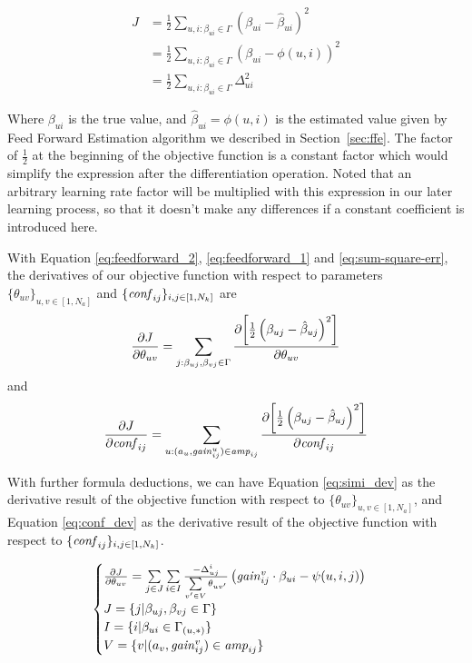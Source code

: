 \begin{equation}
  \label{eq:sum-square-err}
  \begin{aligned}
    J &= \frac{1}{2} \sum_{u,i:\beta_{ui}\in\Gamma} \left(\beta_{ui}-\hat{\beta}_{ui}\right)^2 \\
    &= \frac{1}{2} \sum_{u,i:\beta_{ui}\in\Gamma} \left(\beta_{ui}-\phi(u,i)\right)^2 \\
    &= \frac{1}{2} \sum_{u,i:\beta_{ui}\in\Gamma} \Delta^2_{ui}
  \end{aligned}
\end{equation}

Where $\beta_{ui}$ is the true value, and $\hat{\beta}_{ui}=\phi(u,i)$
is the estimated value given by Feed Forward Estimation algorithm we
described in Section~\ref{sec:ffe}. The factor of $\frac{1}{2}$ at the
beginning of the objective function is a constant factor which would
simplify the expression after the differentiation operation. Noted
that an arbitrary learning rate factor will be multiplied with this
expression in our later learning process, so that it doesn't make any
differences if a constant coefficient is introduced here.

With Equation \ref{eq:feedforward_2}, \ref{eq:feedforward_1} and
\ref{eq:sum-square-err}, the derivatives of our objective function
with respect to parameters $\{\theta_{uv}\}_{u,v\in[1,N_a]}$ and
$\{\mathit{conf}_{ij}\}_{i,j\in[1,N_k]}$ are
\[
\frac{\partial {J}}{\partial {\theta_{uv}}} = \sum_{j:\beta_{uj},\beta_{vj}\in\Gamma} \frac{\partial {\left[\frac{1}{2}\left(\beta_{uj}-\hat{\beta}_{uj}\right)^2\right]}}{\partial {\theta_{uv}}}
\]
and
\[
\frac{\partial {J}}{\partial {\mathit{conf}_{ij}}} = \sum_{u:(a_u,\mathit{gain}^{u}_{ij})\in\mathit{amp}_{ij}} \frac{\partial {\left[\frac{1}{2}\left(\beta_{uj}-\hat{\beta}_{uj}\right)^2\right]}}{\partial {\mathit{conf}_{ij}}}
\]

With further formula deductions, we can have Equation
\ref{eq:simi_dev} as the derivative result of the objective function
with respect to $\{\theta_{uv}\}_{u,v\in[1,N_a]}$, and Equation
\ref{eq:conf_dev} as the derivative result of the objective function
with respect to $\{\mathit{conf}_{ij}\}_{i,j\in[1,N_k]}$.

\begin{equation}
  \label{eq:simi_dev}
  \begin{cases}
    \pa{J}{\theta_{uv}}=\sum\limits_{j\in J} \sum\limits_{i\in I} \frac{-\Delta_{uj}^{i}}{\sum \limits_{v'\in V} \theta_{{u}{v'}}}  \left(\gain{v}{ij}\cdot\beta_{ui}- \psi(u,i,j)\right) \\
    J=\{j|\beta_{uj},\beta_{vj}\in\Gamma\} \\
    I=\{i|\beta_{ui}\in\Gamma_{(u,*)}\} \\
    V=\{v|(a_{v},\gain{{v}}{ij})\in \amp{ij}\}
  \end{cases}
\end{equation}

